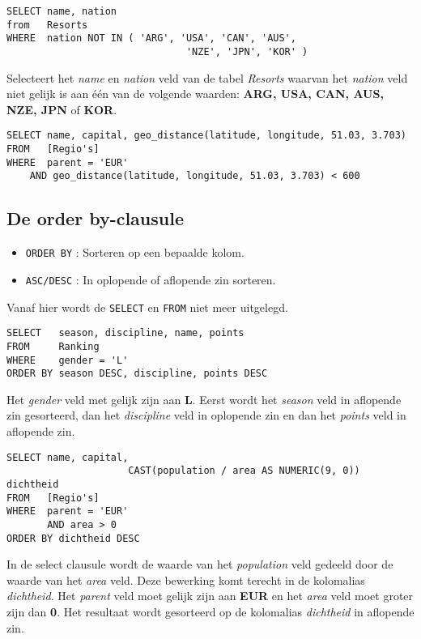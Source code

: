 \documentclass[12pt]{report}
\newcommand{\sepline}{ \noindent{\rule{\linewidth}{0.4pt}}}
\begin{document}
\sepline

\begin{verbatim}
SELECT name, nation
from   Resorts
WHERE  nation NOT IN ( 'ARG', 'USA', 'CAN', 'AUS',
		                       'NZE', 'JPN', 'KOR' )
\end{verbatim}
Selecteert het \textit{name} en \textit{nation} veld van de tabel \textit{Resorts} waarvan het \textit{nation} veld niet gelijk is aan één van de volgende waarden:
\textbf{ARG, USA, CAN, AUS, NZE, JPN} of \textbf{KOR}.

\sepline

\begin{verbatim}
SELECT name, capital, geo_distance(latitude, longitude, 51.03, 3.703)
FROM   [Regio's]
WHERE  parent = 'EUR' 
	AND geo_distance(latitude, longitude, 51.03, 3.703) < 600
\end{verbatim}

\subsection{De order by-clausule}
\begin{itemize}
 \item \texttt{ORDER BY} : Sorteren op een bepaalde kolom.
 \item \texttt{ASC/DESC} : In oplopende of aflopende zin sorteren.
\end{itemize}
Vanaf hier wordt de \texttt{SELECT} en \texttt{FROM} niet meer uitgelegd.
\begin{verbatim}
SELECT   season, discipline, name, points
FROM     Ranking
WHERE    gender = 'L'
ORDER BY season DESC, discipline, points DESC
\end{verbatim}
Het \textit{gender} veld met gelijk zijn aan \textbf{L}. Eerst wordt het \textit{season} veld in aflopende zin gesorteerd, dan het \textit{discipline} veld in
oplopende zin en dan het \textit{points} veld in aflopende zin.

\sepline

\begin{verbatim}
SELECT name, capital,
		             CAST(population / area AS NUMERIC(9, 0)) dichtheid
FROM   [Regio's]
WHERE  parent = 'EUR'
       AND area > 0
ORDER BY dichtheid DESC		
\end{verbatim}
In de select clausule wordt de waarde van het \textit{population} veld gedeeld door de waarde van het \textit{area} veld. 
Deze bewerking komt terecht in de kolomalias \textit{dichtheid}. Het \textit{parent} veld moet gelijk zijn aan \textbf{EUR}
en het \textit{area} veld moet groter zijn dan \textbf{0}. Het resultaat wordt gesorteerd op de kolomalias \textit{dichtheid} in 
aflopende zin.
\end{document}
